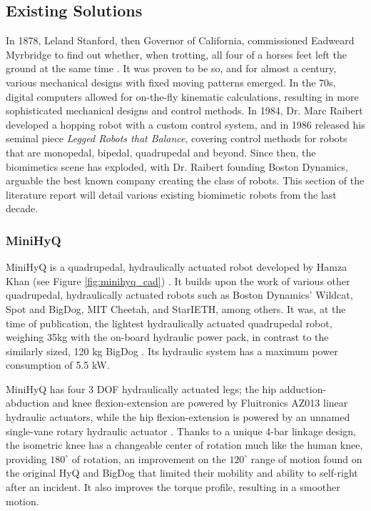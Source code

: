\subsection{Existing Solutions}

In 1878, Leland Stanford, then Governor of California, commissioned Eadweard Myrbridge to find out whether, when trotting, all four of a horses feet left the ground at the same time \cite{raibert_legged_1986}.
It was proven to be so, and for almost a century, various mechanical designs with fixed moving patterns emerged.
In the 70s, digital computers allowed for on-the-fly kinematic calculations, resulting in more sophisticated mechanical designs and control methods.
In 1984, Dr. Marc Raibert developed a hopping robot with a custom control system, and in 1986 released his seminal piece \textit{Legged Robots that Balance}, covering control methods for robots that are monopedal, bipedal, quadrupedal and beyond.
Since then, the biomimetics scene has exploded, with Dr. Raibert founding Boston Dynamics, arguable the best known company creating the class of robots.
This section of the literature report will detail various existing biomimetic robots from the last decade.

\subsubsection{MiniHyQ}

MiniHyQ is a quadrupedal, hydraulically actuated robot developed by Hamza Khan (see Figure \ref{fig:minihyq_cad}) \cite{khan_development_2015}.
It builds upon the work of various other quadrupedal, hydraulically actuated robots such as Boston Dynamics' Wildcat, Spot and BigDog, MIT Cheetah, and StarIETH, among others.
It was, at the time of publication, the lightest hydraulically actuated quadrupedal robot, weighing 35kg with the on-board hydraulic power pack, in contrast to the similarly sized, 120 kg BigDog \cite{khan_minihyq_2015}.
Its hydraulic system has a maximum power consumption of 5.5 kW.

MiniHyQ has four 3 DOF hydraulically actuated legs; the hip adduction-abduction and knee flexion-extension are powered by Fluitronics AZ013 linear hydraulic actuators, while the hip flexion-extension is powered by an unnamed single-vane rotary hydraulic actuator \cite{khan_minihyq_2015}.
Thanks to a unique 4-bar linkage design, the isometric knee has a changeable center of rotation much like the human knee, providing $180^{\circ}$ of rotation, an improvement on the $120^{\circ}$ range of motion found on the original HyQ and BigDog that limited their mobility and ability to self-right after an incident. It also improves the torque profile, resulting in a smoother motion.

